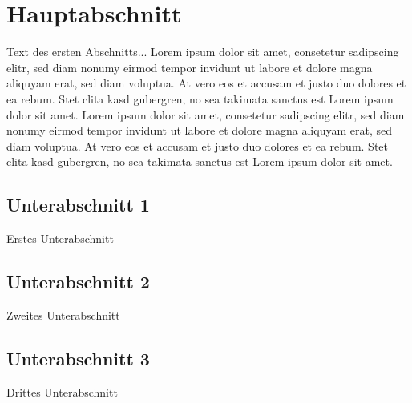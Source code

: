 \section{Hauptabschnitt}\label{hauptabschnitt}

Text des ersten Abschnitts... Lorem ipsum dolor sit amet, consetetur sadipscing elitr, sed diam nonumy eirmod tempor invidunt ut labore et dolore magna aliquyam erat, sed diam voluptua. At vero eos et accusam et justo duo dolores et ea rebum. Stet clita kasd gubergren, no sea takimata sanctus est Lorem ipsum dolor sit amet. Lorem ipsum dolor sit amet, consetetur sadipscing elitr, sed diam nonumy eirmod tempor invidunt ut labore et dolore magna aliquyam erat, sed diam voluptua. At vero eos et accusam et justo duo dolores et ea rebum. Stet clita kasd gubergren, no sea takimata sanctus est Lorem ipsum dolor sit amet.

\subsection{Unterabschnitt 1}\label{unterabschnitt_1}

Erstes Unterabschnitt

\subsection{Unterabschnitt 2}\label{unterabschnitt_2}

Zweites Unterabschnitt

\subsection{Unterabschnitt 3}\label{unterabschnitt_3}

Drittes Unterabschnitt
